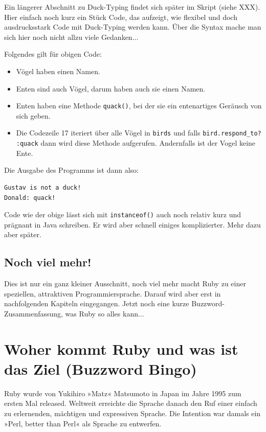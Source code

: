 \documentclass[a4book,11pt,twoside]{scrbook}
\begin{document}
Ein längerer Abschnitt zu Duck-Typing findet sich später im Skript (siehe XXX). Hier einfach noch kurz ein Stück Code, das aufzeigt, wie flexibel und doch ausdrucksstark Code mit Duck-Typing werden kann. Über die Syntax mache man sich hier noch nicht allzu viele Gedanken...



Folgendes gilt für obigen Code:
\begin{itemize}
	\item Vögel haben einen Namen.
	\item Enten sind auch Vögel, darum haben auch sie einen Namen.
	\item Enten haben eine Methode \texttt{quack()}, bei der sie ein entenartiges Geräusch von sich geben.
	\item Die Codezeile 17 iteriert über alle Vögel in \texttt{birds} und falls \texttt{bird.respond\_to? :quack} dann wird diese Methode aufgerufen. Andernfalls ist der Vogel keine Ente.
\end{itemize}

Die Ausgabe des Programms ist dann also:

\begin{lstlisting}
Gustav is not a duck!
Donald: quack!
\end{lstlisting}

Code wie der obige lässt sich mit \texttt{instanceof()} auch noch relativ kurz und prägnant in Java schreiben. Er wird aber schnell einiges komplizierter. Mehr dazu aber später.



\subsection*{Noch viel mehr!} %
\label{sub:noch_viel_mehr_}
Dies ist nur ein ganz kleiner Ausschnitt, noch viel mehr macht Ruby zu einer speziellen, attraktiven Programmiersprache. Darauf wird aber erst in nachfolgenden Kapiteln eingegangen. Jetzt noch eine kurze Buzzword-Zusammenfassung, was Ruby so alles kann...




\section{Woher kommt Ruby und was ist das Ziel (Buzzword Bingo)} %
\label{sec:woher_kommt_ruby_und_was_ist_das_ziel}
Ruby wurde von Yukihiro »Matz« Matsumoto in Japan im Jahre 1995 zum ersten Mal released. Weltweit erreichte die Sprache danach den Ruf einer einfach zu erlernenden, mächtigen und expressiven Sprache.
Die Intention war damals ein »Perl, better than Perl« als Sprache zu entwerfen.
\end{document}
